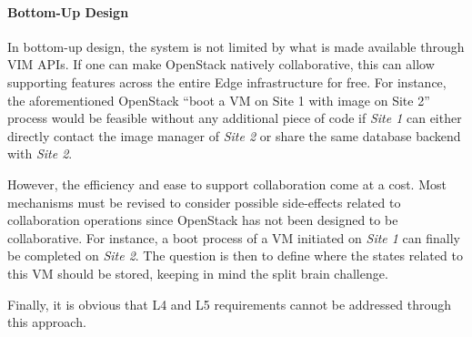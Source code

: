 

\paragraph{Bottom-Up Design}
In bottom-up design, the system is not limited by what is made
available through VIM APIs. If one can make OpenStack natively
collaborative, this can allow supporting features across the entire
Edge infrastructure for free. For instance, the aforementioned
OpenStack ``boot a VM on Site 1 with image on Site 2'' process would
be feasible without any additional piece of code if \emph{Site 1} can
either directly contact the image manager of \emph{Site 2} or share
the same database backend with \emph{Site 2}.

However, the efficiency and ease to support collaboration come at a
cost. Most mechanisms must be revised to consider possible
side-effects related to collaboration operations since OpenStack has
not been designed to be collaborative.
%
For instance, a boot process of a VM initiated on \emph{Site 1} can
finally be completed on \emph{Site 2}. The question is then to define
where the states related to this VM should be stored, keeping in mind the split brain challenge. 

Finally, it is obvious that L4 and L5 requirements cannot be addressed through this approach. 

%



